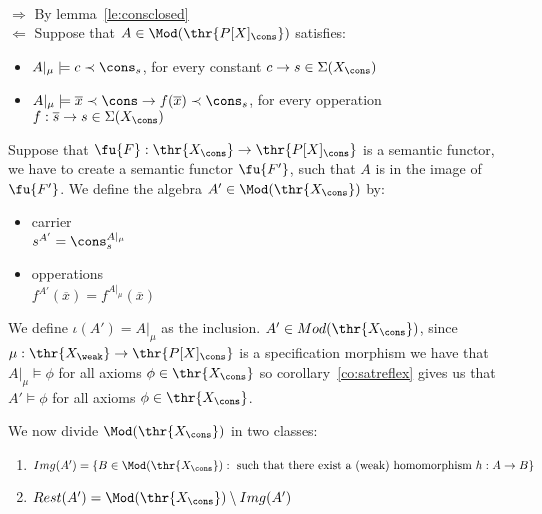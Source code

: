 
\begin{PROOF}\\
$\Rightarrow$ By lemma~\ref{le:consclosed}\\
$\Leftarrow$ Suppose that $A \in \Mod(\thr{P[X]_\cons})$ satisfies:
	\begin{itemize}
	\item $A|_\mu \models c \prec \cons_s$, for every constant $c \to s \in \Sigma(X_\cons)$
	\item $A|_\mu \models \overline{x} \prec \cons \to f(\overline{x}) \prec \cons_s$, for every opperation $f:\overline{s} \to s \in \Sigma(X_\cons)$
	\end{itemize}
Suppose that $\fu{F}: \thr{X_\cons} \to \thr{P[X]_\cons}$ is a semantic functor, we have to create a semantic functor $\fu{F'}$, such that $A$ is in the image of $\fu{F'}$. We define the algebra $A' \in  \Mod(\thr{X_\cons})$ by:

	\begin{itemize}
	\item carrier\\ 
		$s^{A'} = \cons_s^{A|_\mu}$
	\item opperations\\
		$f^{A'}(\overline{x}) = f^{A|_\mu}(\overline{x})$
	\end{itemize}

We define $\iota(A') = A|_\mu$ as the inclusion.
$A' \in Mod(\thr{X_\cons})$, since $\mu: \thr{X_\weak} \to  \thr{P[X]_\cons}$ is a specification morphism we have that $A|_\mu \models \phi$ for all axioms $\phi \in \thr{X_\cons}$ so corollary~\ref{co:satreflex} gives us that $A' \models \phi$ for all axioms $\phi \in \thr{X_\cons}$.

We now divide $\Mod(\thr{X_\cons})$ in two classes:


	\begin{enumerate}
	\item $Img(A') = \{ B \in \Mod(\thr{X_\cons}): \mbox{ such that there exist a (weak) homomorphism }h:A \to B \}$
	\item $Rest(A') = \Mod(\thr{X_\cons}) \setminus Img(A')$
	\end{enumerate}


\end{PROOF}
